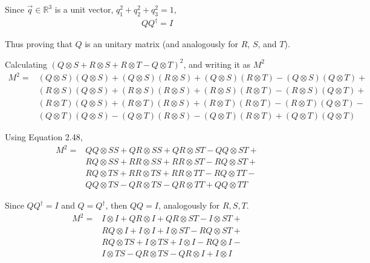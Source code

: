 Since $\vec{q} \in \mathbb{R}^3$ is a unit vector,
$q_1^2 + q_2^2 + q_3^2 = 1$,
%
\begin{align}
    Q Q^\dagger = I
\end{align}

Thus proving that $Q$ is an unitary matrix
(and analogously for $R$, $S$, and $T$).

Calculating $(Q \otimes S + R \otimes S + R \otimes T - Q \otimes T)^2$,
and writing it as $M^2$
%
\begin{align}
    M^2 =
    &(Q \otimes S)(Q \otimes S) + (Q \otimes S)(R \otimes S) +
    (Q \otimes S)(R \otimes T) - (Q \otimes S)(Q \otimes T) +
    \nonumber \\
    & (R \otimes S)(Q \otimes S) + (R \otimes S)(R \otimes S) +
    (R \otimes S)(R \otimes T) - (R \otimes S)(Q \otimes T) +
    \nonumber \\
    &(R \otimes T)(Q \otimes S) + (R \otimes T)(R \otimes S) +
    (R \otimes T)(R \otimes T) - (R \otimes T)(Q \otimes T) -
    \nonumber \\
    &(Q \otimes T)(Q \otimes S) - (Q \otimes T)(R \otimes S) -
    (Q \otimes T)(R \otimes T) + (Q \otimes T)(Q \otimes T)
\end{align}

Using Equation 2.48,
%
\begin{align}
    M^2 =
    &QQ \otimes SS + QR \otimes SS + QR \otimes ST - QQ \otimes ST +
    \nonumber \\
    &RQ \otimes SS + RR \otimes SS + RR \otimes ST - RQ \otimes ST +
    \nonumber \\
    &RQ \otimes TS + RR \otimes TS + RR \otimes TT - RQ \otimes TT -
    \nonumber \\
    &QQ \otimes TS - QR \otimes TS - QR \otimes TT + QQ \otimes TT
\end{align}

Since $QQ^\dagger = I$ and $Q = Q^\dagger$, then $QQ = I$,
analogously for $R, S, T$.
%
\begin{align}
    M^2 = 
    &I \otimes I + QR \otimes I + QR \otimes ST - I \otimes ST +
    \nonumber \\
    &RQ \otimes I + I \otimes I + I \otimes ST - RQ \otimes ST +
    \nonumber \\
    &RQ \otimes TS + I \otimes TS + I \otimes I - RQ \otimes I -
    \nonumber \\
    &I \otimes TS - QR \otimes TS - QR \otimes I + I \otimes I
\end{align}

